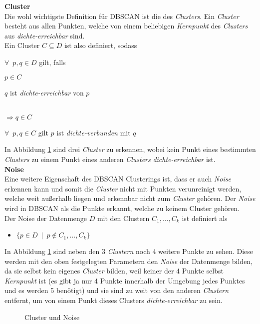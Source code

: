 \documentclass{lni}
\newcommand{\SubItem}[1]{
    {\setlength\itemindent{15pt} \item[-] #1}
}
\begin{document}

\begin{minipage}{\textwidth}

\textbf{Cluster}\\
Die wohl wichtigste Definition für DBSCAN ist die des \textit{Clusters}. Ein \textit{Cluster} besteht aus allen Punkten, welche von einem beliebigen \textit{Kernpunkt} des \textit{Clusters} aus \textit{dichte-erreichbar} sind.\\
Ein Cluster $ C \subseteq D $ ist also definiert, sodass
\begin{itemize}
    \item $\forall\enspace p,q \in D$ gilt, falls
        \SubItem{$p \in C$}
        \SubItem{$q$ ist \textit{dichte-erreichbar} von $p$}\\
        $\Rightarrow q \in C$
    \item $\forall\enspace p,q \in C$ gilt $p$ ist \textit{dichte-verbunden} mit $q$
\end{itemize}
In Abbildung \ref{fig:3} sind drei \textit{Cluster} zu erkennen, wobei kein Punkt eines bestimmten \textit{Clusters} zu einem Punkt eines anderen \textit{Clusters} \textit{dichte-erreichbar} ist.\\

    
\textbf{Noise}\\
Eine weitere Eigenschaft des DBSCAN Clusterings ist, dass er auch \textit{Noise} erkennen kann und somit die \textit{Cluster} nicht mit Punkten verunreinigt werden, welche weit außerhalb liegen und erkennbar nicht zum \textit{Cluster} gehören. Der \textit{Noise} wird in DBSCAN als die Punkte erkannt, welche zu keinem Cluster gehören.\\
Der Noise der Datenmenge $D$ mit den Clustern $C_1,\dots,C_k$ ist definiert als
\begin{itemize}
    \item $ \{ p \in D \enspace | \enspace p \notin C_1,\dots,C_k \} $
\end{itemize}
In Abbildung \ref{fig:3} sind neben den 3 \textit{Clustern} noch 4 weitere Punkte zu sehen. Diese werden mit den oben festgelegten Parametern den \textit{Noise} der Datenmenge bilden, da sie selbst kein eigenes \textit{Cluster} bilden, weil keiner der 4 Punkte selbst \textit{Kernpunkt} ist (es gibt ja nur 4 Punkte innerhalb der Umgebung jedes Punktes und es werden 5 benötigt) und sie sind zu weit von den anderen \textit{Clustern} entfernt, um von einem Punkt dieses Clusters \textit{dichte-erreichbar} zu sein.


\begin{figure}[H]
    \centering
    
    \caption{Cluster und Noise}
    \label{fig:3}
\end{figure}

\end{minipage}
\end{document}
